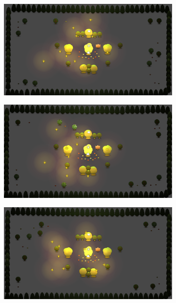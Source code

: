 \begin{figure}[h]
\begin{subfigure}[b]{0.48\linewidth}
                \caption{}
                \label{fig:ga_outcome_2}
        \end{subfigure}
        \begin{subfigure}[b]{0.48\linewidth}
                \includegraphics[width=\linewidth]{./ga_outcome_3}
                \caption{}
                \label{fig:ga_outcome_3}
        \end{subfigure}
        \begin{subfigure}[b]{0.48\linewidth}
                \includegraphics[width=\linewidth]{./ga_outcome_4}
                \caption{}
                \label{fig:ga_outcome_4}
        \end{subfigure}
        \begin{subfigure}[b]{0.48\linewidth}
                \includegraphics[width=\linewidth]{./ga_outcome_5}

\end{subfigure}
\end{figure}

